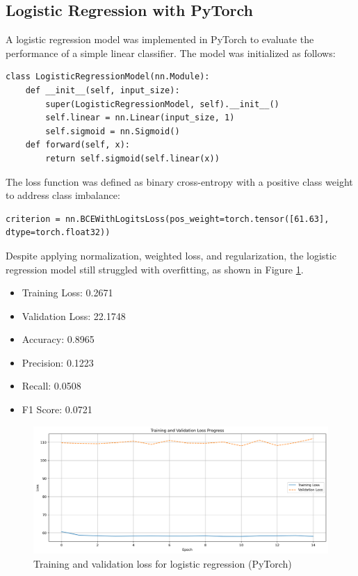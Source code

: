 \documentclass[8pt,a4paper]{article}
\begin{document}
\subsection{Logistic Regression with PyTorch}
A logistic regression model was implemented in PyTorch to evaluate the performance of a simple linear classifier. The model was initialized as follows:
\begin{lstlisting}
class LogisticRegressionModel(nn.Module):
    def __init__(self, input_size):
        super(LogisticRegressionModel, self).__init__()
        self.linear = nn.Linear(input_size, 1)
        self.sigmoid = nn.Sigmoid()
    def forward(self, x):
        return self.sigmoid(self.linear(x))
\end{lstlisting}
The loss function was defined as binary cross-entropy with a positive class weight to address class imbalance:
\begin{lstlisting}
criterion = nn.BCEWithLogitsLoss(pos_weight=torch.tensor([61.63], dtype=torch.float32))
\end{lstlisting}
Despite applying normalization, weighted loss, and regularization, the logistic regression model still struggled with overfitting, as shown in Figure \ref{fig:logistic_torch}.

\begin{itemize}
\item Training Loss: 0.2671
\item Validation Loss: 22.1748
\item Accuracy: 0.8965
\item Precision: 0.1223
\item Recall: 0.0508
\item F1 Score: 0.0721
\end{itemize}
\begin{figure}[h]
    \centering
    \includegraphics[width=\textwidth]{../training_validation_loss_Iteration6.png}
    \caption{Training and validation loss for logistic regression (PyTorch)}
    \label{fig:logistic_torch}
\end{figure}
\end{document}
